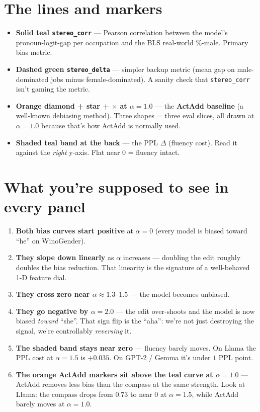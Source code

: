 \documentclass[11pt]{article}
\begin{document}
\section*{The lines and markers}
\begin{itemize}
    \item \textbf{Solid teal \texttt{stereo\_corr}} --- Pearson correlation between the model's pronoun-logit-gap per occupation and the BLS real-world \%-male. Primary bias metric.
    \item \textbf{Dashed green \texttt{stereo\_delta}} --- simpler backup metric (mean gap on male-dominated jobs minus female-dominated). A sanity check that \texttt{stereo\_corr} isn't gaming the metric.
    \item \textbf{Orange diamond + star + $\times$ at $\alpha{=}1.0$} --- the \textbf{ActAdd baseline} (a well-known debiasing method). Three shapes = three eval slices, all drawn at $\alpha{=}1.0$ because that's how ActAdd is normally used.
    \item \textbf{Shaded teal band at the back} --- the PPL $\Delta$ (fluency cost). Read it against the \emph{right} y-axis. Flat near $0$ = fluency intact.
\end{itemize}

\section*{What you're supposed to see in every panel}
\begin{enumerate}
    \item \textbf{Both bias curves start positive} at $\alpha{=}0$ (every model is biased toward ``he'' on WinoGender).
    \item \textbf{They slope down linearly} as $\alpha$ increases --- doubling the edit roughly doubles the bias reduction. That linearity is the signature of a well-behaved 1-D feature dial.
    \item \textbf{They cross zero near $\alpha \approx 1.3\text{--}1.5$} --- the model becomes unbiased.
    \item \textbf{They go negative by $\alpha{=}2.0$} --- the edit over-shoots and the model is now biased \emph{toward} ``she''. That sign flip is the ``aha'': we're not just destroying the signal, we're controllably \emph{reversing} it.
    \item \textbf{The shaded band stays near zero} --- fluency barely moves. On Llama the PPL cost at $\alpha{=}1.5$ is $+0.035$. On GPT-2 / Gemma it's under $1$ PPL point.
    \item \textbf{The orange ActAdd markers sit above the teal curve at $\alpha{=}1.0$} --- ActAdd removes less bias than the compass at the same strength. Look at Llama: the compass drops from $0.73$ to near $0$ at $\alpha{=}1.5$, while ActAdd barely moves at $\alpha{=}1.0$.
\end{enumerate}
\end{document}
